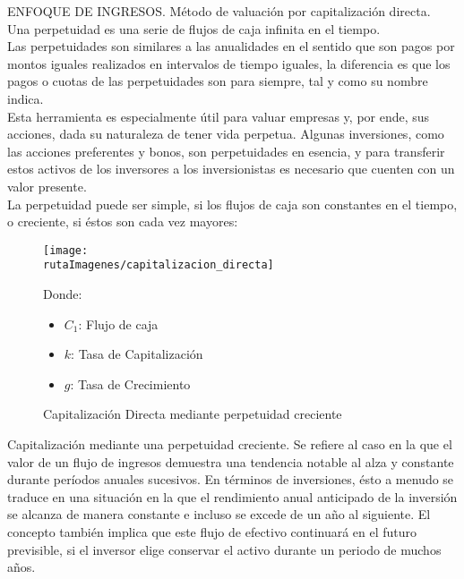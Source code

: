 \textcolor{secundario}{ENFOQUE DE INGRESOS. M\'etodo de valuaci\'on por capitalizaci\'on directa. }\\


Una \textcolor{principal}{perpetuidad} es una serie de flujos de caja infinita en el tiempo. \\

Las \textcolor{principal}{perpetuidades} son similares a las anualidades en el sentido que son pagos por montos iguales realizados en intervalos de tiempo iguales, la diferencia es que los pagos o cuotas de las perpetuidades son para siempre, tal y como su nombre indica. \\

Esta herramienta es especialmente \'util para valuar empresas y, por ende, sus acciones, dada su naturaleza de tener vida perpetua. Algunas inversiones, como las acciones preferentes y bonos, son perpetuidades en esencia, y para transferir estos activos de los inversores a los inversionistas es necesario que cuenten con un valor presente.\\

La perpetuidad puede ser simple, si los flujos de caja son constantes en el tiempo, o creciente, si \'estos son cada vez mayores:\\


\begin{center}
\begin{figure}[H]
\centering
	\caption{Capitalizaci\'on Directa mediante perpetuidad creciente\label{fig:cap_dir}}
	\texttt{[image: \\rutaImagenes/capitalizacion\_directa]}\\
	
	\begin{minipage}{5cm}
	Donde:
	\begin{itemize}
	
		\item $C_1$: Flujo de caja
		\item $k$: Tasa de Capitalizaci\'on
		\item $g$: Tasa de Crecimiento
	\end{itemize}
	\end{minipage}
\end{figure}
\end{center}

\textcolor{principal}{Capitalizaci\'on mediante una perpetuidad creciente.} Se refiere al caso en la que el valor de un flujo de ingresos demuestra una tendencia notable al alza y constante durante per\'iodos anuales sucesivos. En t\'erminos de inversiones, \'esto a menudo se traduce en una situaci\'on en la que el rendimiento anual anticipado de la inversi\'on se alcanza de manera constante e incluso se excede de un a\~no al siguiente. El concepto tambi\'en implica que este flujo de efectivo continuar\'a en el futuro previsible, si el inversor elige conservar el activo durante un periodo de muchos a\~nos.\\


